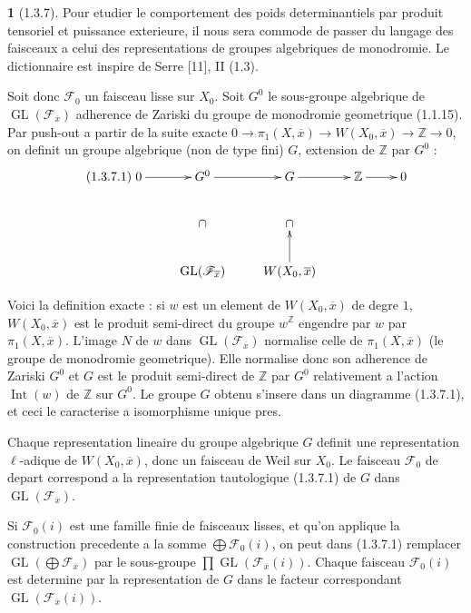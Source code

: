 \documentclass[12pt,a4paper]{article}
\theoremstyle{plain}
\theoremstyle{definition}
\theoremstyle{definition}
\newtheorem{para}{}[section]
\theoremstyle{remark}
\DeclareMathOperator{\GL}{GL}
\DeclareMathOperator{\Int}{Int}
\begin{document}
\begin{para}[1.3.7]
Pour etudier le comportement des poids determinantiels par produit tensoriel et puissance exterieure, il nous sera commode de passer du langage des faisceaux a celui des representations de groupes algebriques de monodromie. Le dictionnaire est inspire de Serre [11], II (1.3).

Soit donc $\mathscr{F}_0$ un faisceau lisse sur $X_0$. Soit $G^0$ le sous-groupe algebrique de $\GL(\mathscr{F}_{\overline{x}})$ adherence de Zariski du groupe de monodromie geometrique (1.1.15). Par push-out a partir de la suite exacte $0 \to \pi_1(X, \overline{x}) \to W(X_0, \overline{x}) \to \mathbb{Z} \to 0$, on definit un groupe algebrique (non de type fini) $G$, extension de $\mathbb{Z}$ par $G^0$ :
\begin{equation}\tag{1.3.7.1}
\xymatrix{
0 \ar[r] & G^0 \ar[r] & G \ar[r] & \mathbb{Z} \ar[r] & 0 \\
& \cap & \cap \\
& \GL(\mathscr{F}_{\overline{x}}) & W(X_0, \overline{x}) \ar[u]
}
\end{equation}

Voici la definition exacte : si $w$ est un element de $W(X_0, \overline{x})$ de degre $1$, $W(X_0, \overline{x})$ est le produit semi-direct du groupe $w^{\mathbb{Z}}$ engendre par $w$ par $\pi_1(X, \overline{x})$. L'image $N$ de $w$ dans $\GL(\mathscr{F}_{\overline{x}})$ normalise celle de $\pi_1(X, \overline{x})$ (le groupe de monodromie geometrique). Elle normalise donc son adherence de Zariski $G^0$ et $G$ est le produit semi-direct de $\mathbb{Z}$ par $G^0$ relativement a l'action $\Int(w)$ de $\mathbb{Z}$ sur $G^0$. Le groupe $G$ obtenu s'insere dans un diagramme (1.3.7.1), et ceci le caracterise a isomorphisme unique pres.

Chaque representation lineaire du groupe algebrique $G$ definit une representation $\ell$-adique de $W(X_0, \overline{x})$, donc un faisceau de Weil sur $X_0$. Le faisceau $\mathscr{F}_0$ de depart correspond a la representation tautologique (1.3.7.1) de $G$ dans $\GL(\mathscr{F}_{\overline{x}})$.

Si $\mathscr{F}_0(i)$ est une famille finie de faisceaux lisses, et qu'on applique la construction precedente a la somme $\bigoplus \mathscr{F}_0(i)$, on peut dans (1.3.7.1) remplacer $\GL(\bigoplus \mathscr{F}_{\overline{x}})$ par le sous-groupe $\prod \GL(\mathscr{F}_{\overline{x}}(i))$. Chaque faisceau $\mathscr{F}_0(i)$ est determine par la representation de $G$ dans le facteur correspondant $\GL(\mathscr{F}_{\overline{x}}(i))$.
\end{para}
\end{document}

